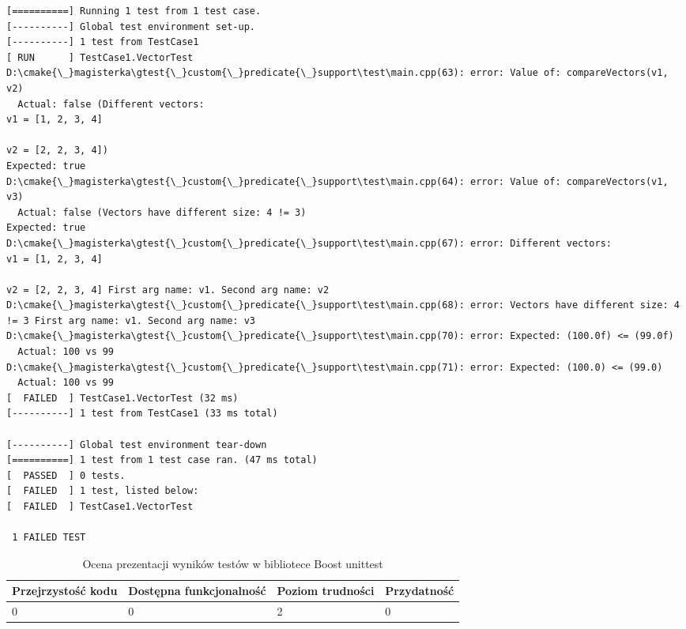\documentclass[12pt,a4paper,notitlepage]{report}
\begin{document}
		\begin{lstlisting}[label=some-code,caption=Przykłądowy negatywny wynik testu w bibliotece Google test]
[==========] Running 1 test from 1 test case.
[----------] Global test environment set-up.
[----------] 1 test from TestCase1
[ RUN      ] TestCase1.VectorTest
D:\cmake{\_}magisterka\gtest{\_}custom{\_}predicate{\_}support\test\main.cpp(63): error: Value of: compareVectors(v1, v2)
  Actual: false (Different vectors:
v1 = [1, 2, 3, 4]

v2 = [2, 2, 3, 4])
Expected: true
D:\cmake{\_}magisterka\gtest{\_}custom{\_}predicate{\_}support\test\main.cpp(64): error: Value of: compareVectors(v1, v3)
  Actual: false (Vectors have different size: 4 != 3)
Expected: true
D:\cmake{\_}magisterka\gtest{\_}custom{\_}predicate{\_}support\test\main.cpp(67): error: Different vectors:
v1 = [1, 2, 3, 4]

v2 = [2, 2, 3, 4] First arg name: v1. Second arg name: v2
D:\cmake{\_}magisterka\gtest{\_}custom{\_}predicate{\_}support\test\main.cpp(68): error: Vectors have different size: 4 != 3 First arg name: v1. Second arg name: v3
D:\cmake{\_}magisterka\gtest{\_}custom{\_}predicate{\_}support\test\main.cpp(70): error: Expected: (100.0f) <= (99.0f)
  Actual: 100 vs 99
D:\cmake{\_}magisterka\gtest{\_}custom{\_}predicate{\_}support\test\main.cpp(71): error: Expected: (100.0) <= (99.0)
  Actual: 100 vs 99
[  FAILED  ] TestCase1.VectorTest (32 ms)
[----------] 1 test from TestCase1 (33 ms total)

[----------] Global test environment tear-down
[==========] 1 test from 1 test case ran. (47 ms total)
[  PASSED  ] 0 tests.
[  FAILED  ] 1 test, listed below:
[  FAILED  ] TestCase1.VectorTest

 1 FAILED TEST
		\end{lstlisting}

\begin{center}
			\begin{table}[!ht]
			\caption{Ocena prezentacji wyników testów w bibliotece Boost unittest}
			\label{}
			\begin{tabular}[!hc]{|l|l|l|l|}
		\hline
		Przejrzystość kodu 	&	Dostępna funkcjonalność	&	Poziom trudności	&	Przydatność \\ \hline
		0					&	0						&	2					& 	0  			\\ \hline
			\end{tabular}
			\end{table} 
		\end{center}
\end{document}
